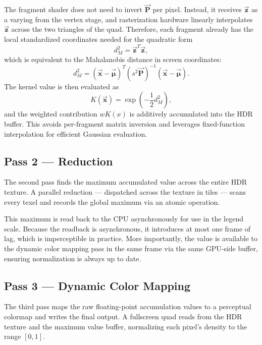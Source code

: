 \documentclass[10pt,conference]{IEEEtran}
\begin{document}
The fragment shader does not need to invert $\overrightarrow{\mathbf{P}}$ per pixel. Instead, it receives $\overrightarrow{\boldsymbol{z}}$ as a varying from the vertex stage, and rasterization hardware linearly interpolates $\overrightarrow{\boldsymbol{z}}$ across the two triangles of the quad. Therefore, each fragment already has the local standardized coordinates needed for the quadratic form
\begin{equation}
d_M^2 = \overrightarrow{\boldsymbol{z}}^T\overrightarrow{\boldsymbol{z}},
\end{equation}
which is equivalent to the Mahalanobis distance in screen coordinates:
\begin{equation}
d_M^2 = (\overrightarrow{\boldsymbol{x}}-\overrightarrow{\boldsymbol{\mu}})^T (s^2\overrightarrow{\mathbf{P}})^{-1}(\overrightarrow{\boldsymbol{x}}-\overrightarrow{\boldsymbol{\mu}}).
\end{equation}
The kernel value is then evaluated as
\begin{equation}
K(\overrightarrow{\boldsymbol{x}})=\exp\left(-\frac{1}{2}d_M^2\right),
\end{equation}
and the weighted contribution $wK(x)$ is additively accumulated into the HDR buffer. This avoids per-fragment matrix inversion and leverages fixed-function interpolation for efficient Gaussian evaluation.

\subsection{Pass 2 --- Reduction}

The second pass finds the maximum accumulated value across the entire HDR texture. A parallel reduction --- dispatched across the texture in tiles --- scans every texel and records the global maximum via an atomic operation.

This maximum is read back to the CPU asynchronously for use in the legend scale. Because the readback is asynchronous, it introduces at most one frame of lag, which is imperceptible in practice. More importantly, the value is available to the dynamic color mapping pass in the same frame via the same GPU-side buffer, ensuring normalization is always up to date.

\subsection{Pass 3 --- Dynamic Color Mapping}

The third pass maps the raw floating-point accumulation values to a perceptual colormap and writes the final output. A fullscreen quad reads from the HDR texture and the maximum value buffer, normalizing each pixel's density to the range $[0, 1]$.
\end{document}
